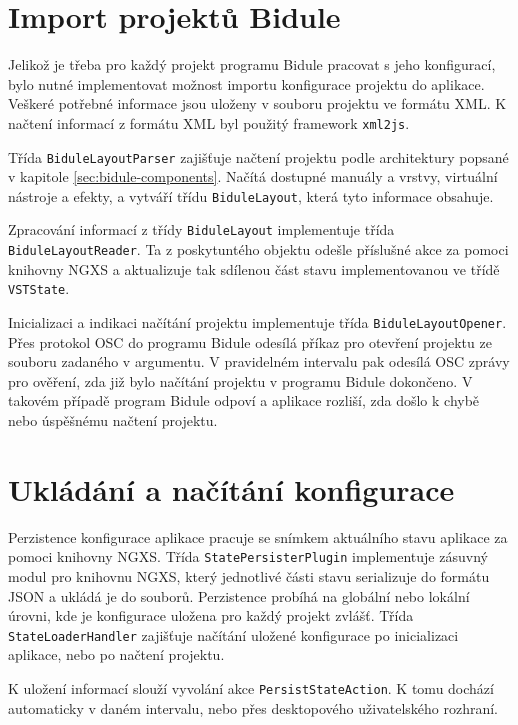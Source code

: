 \documentclass[thesis=M,czech]{FITthesis}[2019/03/06]
\begin{document}
		\section{Import projektů Bidule}
			Jelikož je třeba pro každý projekt programu Bidule pracovat s jeho konfigurací, bylo nutné implementovat možnost importu konfigurace projektu do aplikace. Veškeré potřebné informace jsou uloženy v souboru projektu ve formátu XML. K načtení
			informací z formátu XML byl použitý framework \texttt{xml2js}. 
			
			Třída \texttt{Bidule\-Layout\-Parser} zajišťuje načtení projektu podle architektury popsané v kapitole \ref{sec:bidule-components}.
			Načítá dostupné manuály a vrstvy, virtuální nástroje a efekty,
			a vytváří třídu \texttt{BiduleLayout}, která tyto informace obsahuje.
			
			Zpracování informací z třídy \texttt{BiduleLayout} implementuje třída \texttt{Bidule\-Layou\-tReader}.
			Ta z poskytuntého objektu odešle příslušné akce za pomoci knihovny NGXS a aktualizuje tak sdílenou část stavu implementovanou ve třídě \texttt{VSTState}.
			
			Inicializaci a indikaci načítání projektu implementuje třída \texttt{Bidule\-Layout\-Opener}. Přes protokol OSC do programu Bidule odesílá příkaz pro otevření projektu ze souboru zadaného v argumentu. V pravidelném intervalu pak odesílá OSC zprávy pro ověření, zda již bylo načítání projektu v programu Bidule dokončeno. V takovém případě program Bidule odpoví a aplikace rozliší, zda došlo k chybě nebo úspěšnému načtení projektu.			

		\section{Ukládání a načítání konfigurace}
			Perzistence konfigurace aplikace pracuje se snímkem aktuálního stavu aplikace za pomoci knihovny NGXS.
			Třída \texttt{State\-Persister\-Plugin} implementuje zásuvný modul pro knihovnu NGXS, který jednotlivé části stavu serializuje do formátu JSON a ukládá je do souborů. Perzistence probíhá na globální nebo lokální úrovni, kde je konfigurace uložena pro každý projekt zvlášť. Třída \texttt{State\-Loader\-Handler} zajišťuje načítání uložené konfigurace po inicializaci aplikace, nebo po načtení projektu.
			
			K uložení informací slouží vyvolání akce \texttt{Persist\-State\-Action}. K tomu dochází automaticky v daném intervalu, nebo přes desktopového uživatelského rozhraní.
\end{document}
